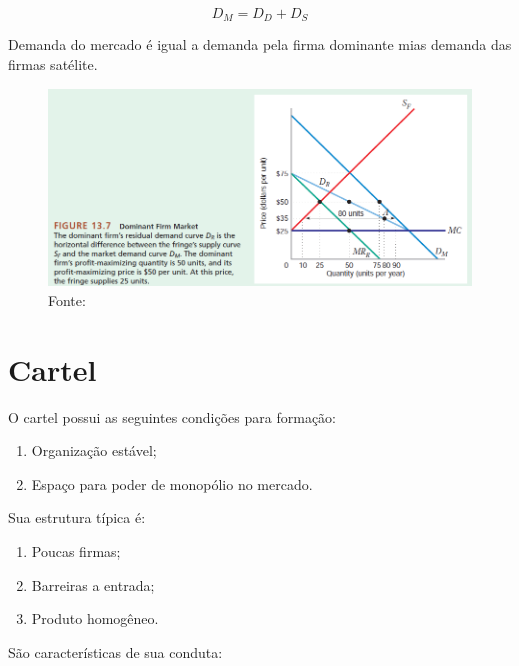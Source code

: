 \documentclass[12pt,a4paper,oneside,brazil]{abntex2}
\begin{document}
\begin{equation}
	 D_M = D_D + D_S
\end{equation}

Demanda do mercado é igual a demanda pela firma dominante mias demanda das firmas satélite.
\begin{figure}[h]
\centering
\includegraphics[scale=0.7]{Firma dominante.png}
\caption{Fonte: \cite[p. 546]{besanko}}
\end{figure}

\section{Cartel}

O cartel possui as seguintes condições para formação:

\begin{enumerate}
	\item Organização estável;
	\item Espaço para poder de monopólio no mercado.
\end{enumerate}

Sua estrutura típica é:
\begin{enumerate}
	\item Poucas firmas;
	\item Barreiras a entrada;
	\item Produto homogêneo.
\end{enumerate}

São características de sua conduta:
\end{document}
